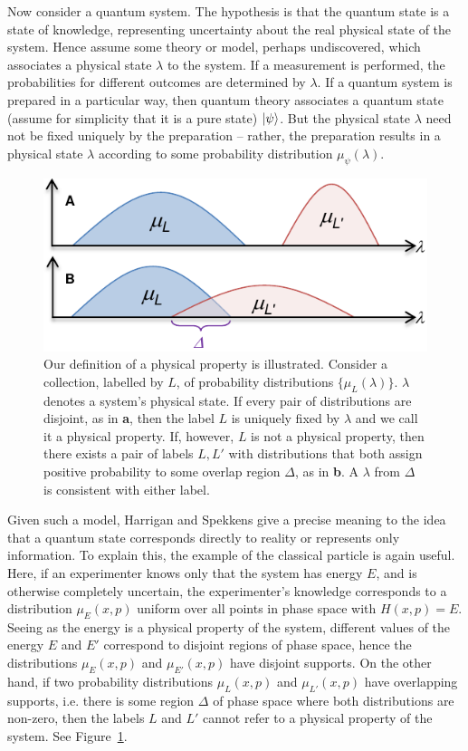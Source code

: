 \documentclass[amsmath,amssymb,superscriptaddress,twocolumn,pra]{revtex4-1}
\begin{document}
Now consider a quantum system. The hypothesis is that the quantum state is a state of knowledge, representing uncertainty about the real physical state of the system. Hence assume some theory or model, perhaps undiscovered, which associates a physical state $\lambda$ to the system. If a measurement is performed, the probabilities for different outcomes are determined by $\lambda$. If a quantum system is prepared in a particular way, then quantum theory associates a quantum state (assume for simplicity that it is a pure state) $\ket{\psi}$. But the physical state $\lambda$ need not be fixed uniquely by the preparation -- rather, the preparation results in a physical state $\lambda$ according to some probability distribution $\mu_\psi(\lambda)$.

\begin{figure}
  \includegraphics[width=\columnwidth]{figs/nogofig1}
  \caption{Our definition of a physical property is illustrated. Consider a collection, labelled by $L$, of probability distributions $\{\mu_L(\lambda)\}$. $\lambda$ denotes a system's physical state. If every pair of distributions are disjoint, as in {\bf a}, then the label $L$ is uniquely fixed by $\lambda$ and we call it a physical property. If, however, $L$ is not a physical property, then there exists a pair of labels $L, L'$ with distributions that both assign positive probability to some overlap region $\Delta$, as in {\bf b}. A $\lambda$ from $\Delta$ is consistent with either label.}

  \label{fig1}
\end{figure}

Given such a model, Harrigan and Spekkens\cite{nic} give a precise meaning to the idea that a quantum state corresponds directly to reality or represents only information. To explain this, the example of the classical particle is again useful. Here, if an experimenter knows only that the system has energy $E$, and is otherwise completely uncertain, the experimenter's knowledge corresponds to a distribution $\mu_E(x,p)$ uniform over all points in phase space with $H(x,p)=E$. Seeing as the energy is a physical property of the system, different values of the energy $E$ and $E'$ correspond to disjoint regions of phase space, hence the distributions $\mu_E(x,p)$ and $\mu_{E'}(x,p)$ have disjoint supports. On the other hand, if two probability distributions $\mu_L(x,p)$ and $\mu_{L'}(x,p)$ have overlapping supports, i.e. there is some region $\Delta$ of phase space where both distributions are non-zero, then the labels $L$ and $L'$ cannot refer to a physical property of the system. See Figure~\ref{fig1}.
\end{document}
